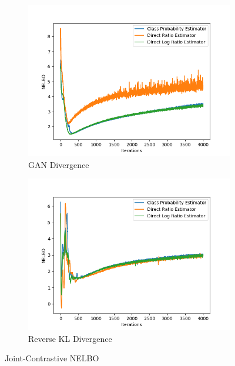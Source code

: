 \documentclass[honours,12pt]{unswthesis}
\numberwithin{equation}{section}
\theoremstyle{definition}
\begin{document}
\begin{figure}
\begin{subfigure}{0.49\textwidth}
\includegraphics[width=\linewidth]{part2nelbos/JCADVvsJCADVexpvsJCADVgudlog.png}
\caption{GAN Divergence}
\end{subfigure}
\begin{subfigure}{0.49\textwidth}
\includegraphics[width=\linewidth]{part2nelbos/JCKLDvsJCKLexpvsJCKLgudlog.png}
\caption{Reverse KL Divergence}
\end{subfigure}
\caption{Joint-Contrastive NELBO}
\end{figure}
\newpage
\end{document}
